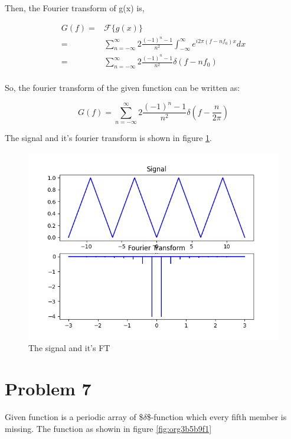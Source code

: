 \documentclass[a4paper,11pt]{article}
\begin{document}
Then, the Fourier transform of g(x) is,

\begin{equation*}
\begin{split}
G(f) = & \mathcal{F}\{g(x)\} \\
= & \sum_{n=-\infty}^{\infty}  2\frac{ (-1)^n-1}{n^2}\int_{-\infty}^{\infty} e^{i 2\pi (f-nf_0) x} dx   \\
= & \sum_{n=-\infty}^{\infty}  2\frac{ (-1)^n-1}{n^2} \delta(f-nf_0)   \\
\end{split}
\end{equation*}

So, the fourier transform of the given function can be written as:

$$G(f) = \sum_{n=-\infty}^{\infty}  2\frac{ (-1)^n-1}{n^2} \delta\left(f-\frac{n}{2\pi}\right)  $$

The signal and it's fourier transform is shown in figure \ref{fig:org049b13c}.

\begin{figure}[htbp]
\centering
\includegraphics[width=.9\linewidth]{Pr6_signal_FT.png}
\caption{\label{fig:org049b13c}The signal and it's FT}
\end{figure}

\newpage
\section*{Problem 7}
\label{sec:org270d154}

Given function is a periodic array of \$\(\delta\)\$-function which every fifth member is missing. The function as showin in figure  \ref{fig:org3b5b9f1}
\end{document}
